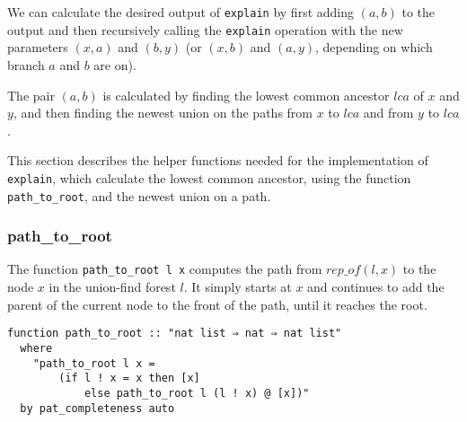 \begin{center}
\end{center}

We can calculate the desired output of \lstinline|explain| by first adding  $(a, b)$ to the output and then recursively calling the \lstinline|explain| operation with the new parameters $(x, a)$ and $(b, y)$ (or $(x, b)$ and $(a, y)$, depending on which branch $a$ and $b$ are on).

The pair $(a, b)$ is calculated by finding the lowest common ancestor $lca$ of $x$ and $y$, and then finding the newest union on the paths from $x$ to $lca$ and from $y$ to $lca$.







This section describes the helper functions needed for the implementation of \lstinline|explain|, which calculate the lowest common ancestor, using the function \lstinline{path_to_root}, and the newest union on a path.

\subsubsection{path\_to\_root}
\label{subsubsection:path-to-root}

The function \lstinline{path_to_root l x} computes the path from $rep\_of(l,x)$ to the node $x$ in the union-find forest $l$. It simply starts at $x$ and continues to add the parent of the current node to the front of the path, until it reaches the root.

\begin{lstlisting}
function path_to_root :: "nat list ⇒ nat ⇒ nat list"
  where
    "path_to_root l x =
        (if l ! x = x then [x]
            else path_to_root l (l ! x) @ [x])"
  by pat_completeness auto
\end{lstlisting}

